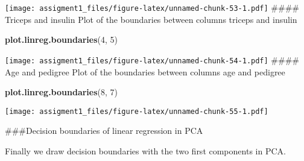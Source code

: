 \documentclass[
]{article}
\newenvironment{Shaded}{\begin{snugshade}}{\end{snugshade}}
\newcommand{\DecValTok}[1]{\textcolor[rgb]{0.00,0.00,0.81}{#1}}
\newcommand{\KeywordTok}[1]{\textcolor[rgb]{0.13,0.29,0.53}{\textbf{#1}}}
\newcommand{\NormalTok}[1]{#1}
\begin{document}
\texttt{[image: assigment1\_files/figure-latex/unnamed-chunk-53-1.pdf]}
\#\#\#\# Triceps and insulin Plot of the boundaries between columns
triceps and insulin

\begin{Shaded}
\begin{Highlighting}[]
\KeywordTok{plot.linreg.boundaries}\NormalTok{(}\DecValTok{4}\NormalTok{, }\DecValTok{5}\NormalTok{)}
\end{Highlighting}
\end{Shaded}

\texttt{[image: assigment1\_files/figure-latex/unnamed-chunk-54-1.pdf]}
\#\#\#\# Age and pedigree Plot of the boundaries between columns age and
pedigree

\begin{Shaded}
\begin{Highlighting}[]
\KeywordTok{plot.linreg.boundaries}\NormalTok{(}\DecValTok{8}\NormalTok{, }\DecValTok{7}\NormalTok{)}
\end{Highlighting}
\end{Shaded}

\texttt{[image: assigment1\_files/figure-latex/unnamed-chunk-55-1.pdf]}

\#\#\#Decision boundaries of linear regression in PCA

Finally we draw decision boundaries with the two first components in
PCA.
\end{document}
